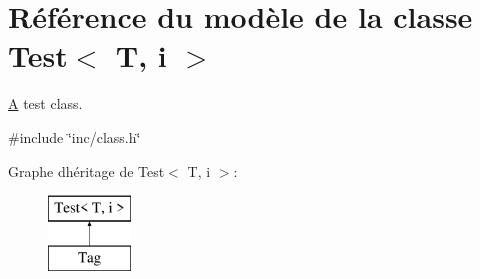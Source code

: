 \hypertarget{class_test}{}\section{Référence du modèle de la classe Test$<$ T, i $>$}
\label{class_test}


\hyperlink{class_a}{A} test class.  




{\ttfamily \#include \char`\"{}inc/class.\+h\char`\"{}}

Graphe d\textquotesingle{}héritage de Test$<$ T, i $>$\+:\begin{figure}[H]
\begin{center}
\leavevmode
\includegraphics[height=2.000000cm]{class_test}
\end{center}
\end{figure}
